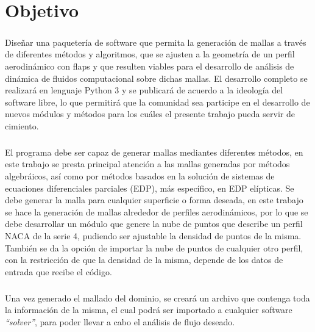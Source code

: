 \documentclass[letterpaper, openright, 12pt]{book}
\begin{document}

    \chapter*{Objetivo}

    \paragraph*{}
    Diseñar una paquetería de software que permita la generación de mallas a
    través de diferentes métodos y algoritmos, que se ajusten a la geometría de
    un perfil aerodinámico con flaps y que resulten viables para el desarrollo
    de análisis  de dinámica de fluidos computacional sobre dichas mallas.
    El desarrollo completo se realizará en lenguaje Python 3 y se publicará de
    acuerdo a la ideología del software libre, lo que permitirá que la comunidad
    sea participe en el desarrollo de nuevos módulos y métodos para los cuáles
    el presente trabajo pueda servir de cimiento.

    \paragraph*{}
    El programa debe ser capaz de generar  mallas mediantes diferentes
    métodos, en este trabajo se presta principal atención a las mallas
    generadas por métodos algebráicos, así como por métodos basados en la
    solución de sistemas de ecuaciones diferenciales parciales (EDP),
    más específico, en EDP elípticas. Se debe generar la malla para
    cualquier superficie o forma deseada, en este trabajo se hace la
    generación de mallas alrededor de perfiles aerodinámicos, por lo que se
    debe desarrollar un módulo que genere la nube de puntos que describe un
    perfil NACA de la serie 4, pudiendo ser ajustable la densidad de puntos
    de la misma. También se da la opción de importar la nube de puntos de
    cualquier otro perfil, con la restricción de que la densidad de la
    misma, depende de los datos de entrada que recibe el código.

    \paragraph*{}
    Una vez generado el mallado del dominio, se creará un archivo que
    contenga toda la información de la misma, el cual podrá ser importado a
    cualquier software \textit{``solver''}, para poder llevar a cabo el
    análisis de flujo deseado.
\end{document}
